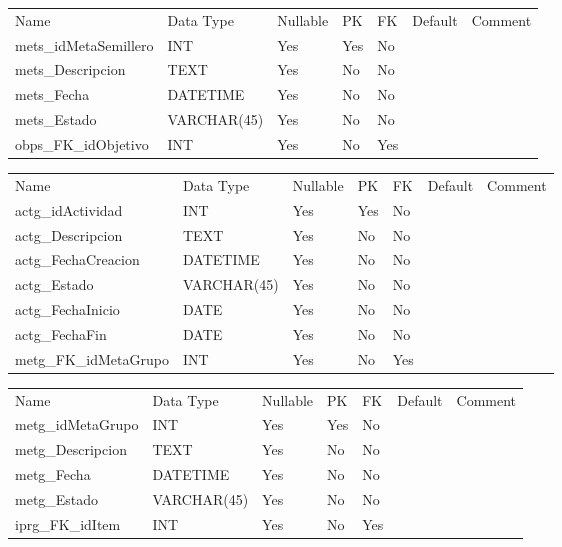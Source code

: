 			\begin{center}
				\begin{tabular}{ |l|l|l|l|l|l|l| }
					\hline
					Name & Data Type & Nullable & PK & FK & Default & Comment \\
					mets_idMetaSemillero & INT & Yes & Yes & No &  & \\ \hline 
mets_Descripcion & TEXT & Yes & No & No &  & \\ \hline 
mets_Fecha & DATETIME & Yes & No & No &  & \\ \hline 
mets_Estado & VARCHAR(45) & Yes & No & No &  & \\ \hline 
obps_FK_idObjetivo & INT & Yes & No & Yes &  & \\ \hline 

				\end{tabular}
			\end{center}
		

			\begin{center}
				\begin{tabular}{ |l|l|l|l|l|l|l| }
					\hline
					Name & Data Type & Nullable & PK & FK & Default & Comment \\
					actg_idActividad & INT & Yes & Yes & No &  & \\ \hline 
actg_Descripcion & TEXT & Yes & No & No &  & \\ \hline 
actg_FechaCreacion & DATETIME & Yes & No & No &  & \\ \hline 
actg_Estado & VARCHAR(45) & Yes & No & No &  & \\ \hline 
actg_FechaInicio & DATE & Yes & No & No &  & \\ \hline 
actg_FechaFin & DATE & Yes & No & No &  & \\ \hline 
metg_FK_idMetaGrupo & INT & Yes & No & Yes &  & \\ \hline 

				\end{tabular}
			\end{center}
		

			\begin{center}
				\begin{tabular}{ |l|l|l|l|l|l|l| }
					\hline
					Name & Data Type & Nullable & PK & FK & Default & Comment \\
					metg_idMetaGrupo & INT & Yes & Yes & No &  & \\ \hline 
metg_Descripcion & TEXT & Yes & No & No &  & \\ \hline 
metg_Fecha & DATETIME & Yes & No & No &  & \\ \hline 
metg_Estado & VARCHAR(45) & Yes & No & No &  & \\ \hline 
iprg_FK_idItem & INT & Yes & No & Yes &  & \\ \hline 

				\end{tabular}
			\end{center}
		


